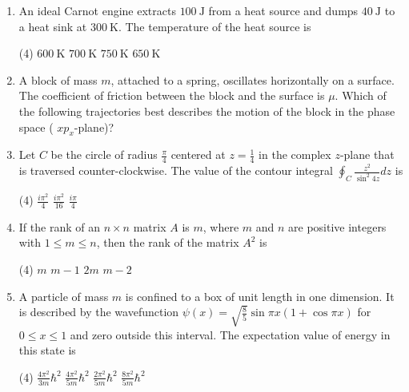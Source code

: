 \begin{enumerate}
\begin{tasks}
	\task[\textbf{a.}]zero
	\task[\textbf{b.}] $\alpha\left(T_{f}-T_{i}\right)+\frac{\alpha}{2 T_{f}}\left(T_{f}-T_{i}\right)^{2}$
	\task[\textbf{c.}] $\alpha\left(T_{f}-T_{i}\right)$
	\task[\textbf{d.}]$\alpha\left(T_{f}-T_{i}\right)+\frac{\alpha}{2 T_{f}}\left(T_{f}^{2}-T_{i}^{2}\right)$
\end{tasks}
\item An ideal Carnot engine extracts $100 \mathrm{~J}$ from a heat source and dumps $40 \mathrm{~J}$ to a heat sink at $300 \mathrm{~K}$. The temperature of the heat source is
 \begin{tasks}(4)
	\task[\textbf{a.}]$600 \mathrm{~K}$
	\task[\textbf{b.}]$700 \mathrm{~K}$
	\task[\textbf{c.}] $750 \mathrm{~K}$
	\task[\textbf{d.}] $650 \mathrm{~K}$
\end{tasks}
\item A block of mass $m$, attached to a spring, oscillates horizontally on a surface. The coefficient of friction between the block and the surface is $\mu$. Which of the following trajectories best describes the motion of the block in the phase space ( $x p_{x}$-plane)?	
\item Let $C$ be the circle of radius $\frac{\pi}{4}$ centered at $z=\frac{1}{4}$ in the complex $z$-plane that is traversed counter-clockwise. The value of the contour integral $\oint_{C} \frac{z^{2}}{\sin ^{2} 4 z} d z$ is
 \begin{tasks}(4)
	\task[\textbf{b.}]$\frac{i \pi^{2}}{4}$
	\task[\textbf{c.}] $\frac{i \pi^{2}}{16}$
	\task[\textbf{d.}] $\frac{i \pi}{4}$
\end{tasks}
\item If the rank of an $n \times n$ matrix $A$ is $m$, where $m$ and $n$ are positive integers with $1 \leq m \leq n$, then the rank of the matrix $A^{2}$ is
 \begin{tasks}(4)
	\task[\textbf{a.}]$m$
	\task[\textbf{b.}]$m-1$
	\task[\textbf{c.}]$2 m$
	\task[\textbf{d.}]$m-2$ 
\end{tasks}
\item A particle of mass $m$ is confined to a box of unit length in one dimension. It is described by the wavefunction $\psi(x)=\sqrt{\frac{8}{5}} \sin \pi x(1+\cos \pi x)$ for $0 \leq x \leq 1$ and zero outside this interval. The expectation value of energy in this state is
 \begin{tasks}(4)
	\task[\textbf{a.}] $\frac{4 \pi^{2}}{3 m} \hbar^{2}$
	\task[\textbf{b.}]$\frac{4 \pi^{2}}{5 m} \hbar^{2}$
	\task[\textbf{c.}]$\frac{2 \pi^{2}}{5 m} \hbar^{2}$
	\task[\textbf{d.}]  $\frac{8 \pi^{2}}{5 m} \hbar^{2}$

\end{tasks}
\end{enumerate}
